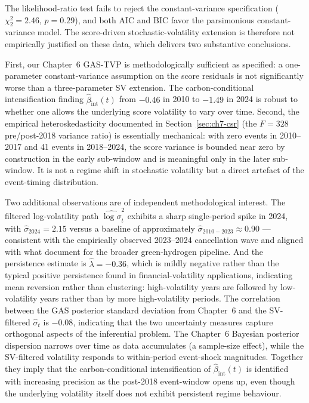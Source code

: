 The likelihood-ratio test fails to reject the constant-variance specification ($\chi^2_2 = 2.46$, $p = 0.29$), and both AIC and BIC favor the parsimonious constant-variance model. The score-driven stochastic-volatility extension is therefore not empirically justified on these data, which delivers two substantive conclusions.

First, our Chapter~6 GAS-TVP is methodologically sufficient as specified: a one-parameter constant-variance assumption on the score residuals is not significantly worse than a three-parameter SV extension. The carbon-conditional intensification finding $\hat\beta_{\mathrm{int}}(t)$ from $-0.46$ in 2010 to $-1.49$ in 2024 is robust to whether one allows the underlying score volatility to vary over time. Second, the empirical heteroskedasticity documented in Section~\ref{sec:ch7-csr} (the $F = 328$ pre/post-2018 variance ratio) is essentially mechanical: with zero events in 2010--2017 and 41 events in 2018--2024, the score variance is bounded near zero by construction in the early sub-window and is meaningful only in the later sub-window. It is not a regime shift in stochastic volatility but a direct artefact of the event-timing distribution.

Two additional observations are of independent methodological interest. The filtered log-volatility path $\hat{\log\sigma}^2_t$ exhibits a sharp single-period spike in 2024, with $\hat\sigma_{2024} = 2.15$ versus a baseline of approximately $\hat\sigma_{2010-2023} \approx 0.90$ --- consistent with the empirically observed 2023--2024 cancellation wave and aligned with what \cite{odenweller2025green} document for the broader green-hydrogen pipeline. And the persistence estimate is $\hat\lambda = -0.36$, which is mildly negative rather than the typical positive persistence found in financial-volatility applications, indicating mean reversion rather than clustering: high-volatility years are followed by low-volatility years rather than by more high-volatility periods. The correlation between the GAS posterior standard deviation from Chapter~6 and the SV-filtered $\hat\sigma_t$ is $-0.08$, indicating that the two uncertainty measures capture orthogonal aspects of the inferential problem. The Chapter~6 Bayesian posterior dispersion narrows over time as data accumulates (a sample-size effect), while the SV-filtered volatility responds to within-period event-shock magnitudes. Together they imply that the carbon-conditional intensification of $\hat\beta_{\mathrm{int}}(t)$ is identified with increasing precision as the post-2018 event-window opens up, even though the underlying volatility itself does not exhibit persistent regime behaviour.

